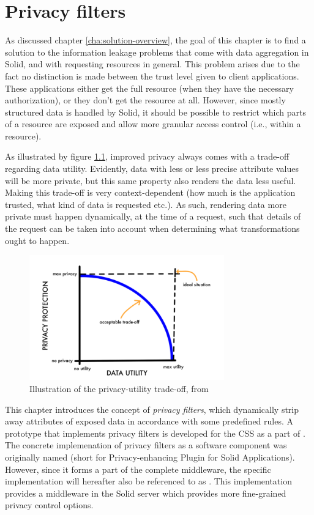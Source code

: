 \chapter{Privacy filters}
\label{cha:privacy-filters}
As discussed chapter \ref{cha:solution-overview}, the goal of this chapter is to find a solution to the information leakage problems that come with data aggregation in Solid, and with requesting resources in general. This problem arises due to the fact no distinction is made between the trust level given to client applications. These applications either get the full resource (when they have the necessary authorization), or they don't get the resource at all. However, since mostly structured data is handled by Solid, it should be possible to restrict which parts of a resource are exposed and allow more granular access control (i.e., within a resource).

As illustrated by figure \ref{fig:privacy-utility-tradeoff}, improved privacy always comes with a trade-off regarding data utility. Evidently, data with less or less precise attribute values will be more private, but this same property also renders the data less useful. Making this trade-off is very context-dependent (how much is the application trusted, what kind of data is requested etc.). As such, rendering data more private must happen dynamically, at the time of a request, such that details of the request can be taken into account when determining what transformations ought to happen.
\begin{figure}[H]
    \centering
    \includegraphics[width=0.75\textwidth]{images/privacy-filter/Data-Privacy-Protection-versus-Data-Utility.png}
    \caption{Illustration of the privacy-utility trade-off, from \citet{datasharing-implications}}
    \label{fig:privacy-utility-tradeoff}
\end{figure}

\noindent This chapter introduces the concept of \textit{privacy filters}, which dynamically strip away attributes of exposed data in accordance with some predefined rules. A prototype that implements privacy filters is developed for the \gls{CSS} as a part of \middleware{}. The concrete implemenation of privacy filters as a software component was originally named \mwprivacy{} (short for Privacy-enhancing Plugin for Solid Applications). However, since it forms a part of the complete middleware, the specific implementation will hereafter also be referenced to as \middleware{}. This implementation provides a middleware in the Solid server which provides more fine-grained privacy control options. 

